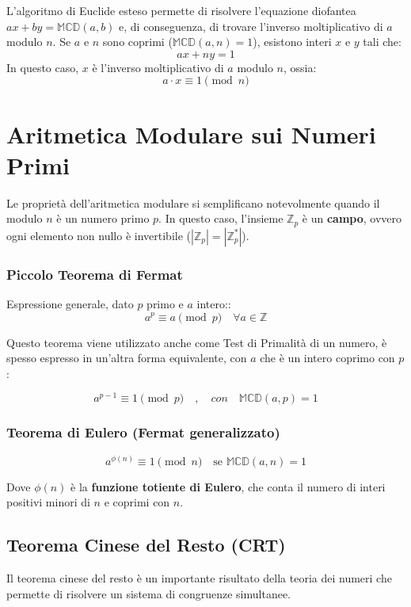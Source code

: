 \documentclass[a4paper,12pt]{report}
\begin{document}
L'algoritmo di Euclide esteso permette di risolvere l'equazione diofantea $ax + by = \mathbb{MCD}(a, b)$ e, di conseguenza, di trovare l'inverso moltiplicativo di $a$ modulo $n$. Se $a$ e $n$ sono coprimi ($\mathbb{MCD}(a, n) = 1$), esistono interi $x$ e $y$ tali che:
\[ax + ny = 1\]
In questo caso, $x$ è l'inverso moltiplicativo di $a$ modulo $n$, ossia:
\[a \cdot x \equiv 1 \pmod{n}\]

\section{Aritmetica Modulare sui Numeri Primi}

Le proprietà dell'aritmetica modulare si semplificano notevolmente quando il modulo $n$ è un numero primo $p$. In questo caso, l'insieme $\mathbb{Z}_p$ è un \textbf{campo}, ovvero ogni elemento non nullo è invertibile (\( |\mathbb{Z}_p| =|\mathbb{Z}_p^*| \)).

\subsubsection*{Piccolo Teorema di Fermat} \label{sec:fermat}
Espressione generale, dato $p$ primo e $a$ intero::
$$a^p \equiv a \pmod{p} \quad \forall a \in \mathbb{Z}$$

Questo teorema viene utilizzato anche come Test di Primalità di un numero, è spesso espresso in un'altra forma equivalente, con \(a\) che è un intero coprimo con \(p\):

\[a^{p-1} \equiv 1 \pmod{p}\quad,\quad con\quad \mathbb{MCD}(a,p)=1\]

\subsubsection*{Teorema di Eulero (Fermat generalizzato)}

$$a^{\phi(n)} \equiv 1 \pmod{n} \quad \text{se } \mathbb{MCD}(a,n) = 1$$

Dove $\phi(n)$ è la \textbf{funzione totiente di Eulero}, che conta il numero di interi positivi minori di $n$ e coprimi con $n$.

\subsection*{Teorema Cinese del Resto (CRT)} \label{sec:cinese}
Il teorema cinese del resto è un importante risultato della teoria dei numeri che permette di risolvere un sistema di congruenze simultanee. 
\end{document}

